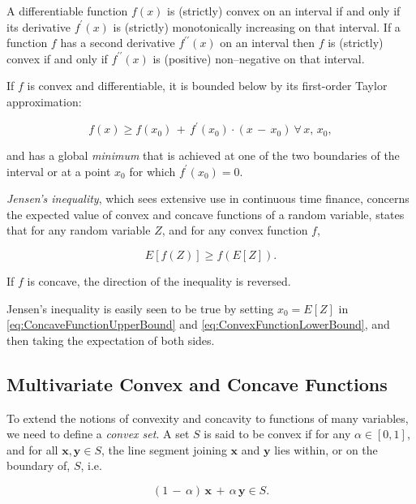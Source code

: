 \documentclass[graybox,envcountchap,sectrefs]{svmono}\usepackage[]{graphicx}\usepackage[]{xcolor}
\begin{document}
\begin{appendices}
A differentiable function $f(x)$ is (strictly) convex on an interval
if and only if its derivative $f^{\prime}(x)$ is (strictly) monotonically
increasing on that interval. If a function $f$ has a second derivative
$f^{\prime\prime}(x)$ on an interval then $f$ is (strictly) convex
if and only if $f^{\prime\prime}(x)$ is (positive) non--negative
on that interval.

If $f$ is convex and differentiable, it is bounded below by its first-order
Taylor approximation:

\begin{equation}
f(x)\geqslant f(x_{0})\,+\,f^{\prime}(x_{0})\cdot(x\,-\,x_{0})\ \forall\,x,\,x_{0},\label{eq:ConvexFunctionLowerBound}
\end{equation}

and has a global \emph{minimum} that is achieved at one of the two
boundaries of the interval or at a point $x_{0}$ for which $f^{\prime}(x_{0})=0.$ 

\emph{Jensen's inequality}, which sees extensive use in continuous
time finance, concerns the expected value of convex and concave functions
of a random variable, states that for any random variable $Z$, and
for any convex function $f$,

\begin{equation}
E\left[f\left(Z\right)\right]\geqslant f\left(E\left[Z\right]\right).\label{eq:JensensInequalityConvexFunction}
\end{equation}

If $f$ is concave, the direction of the inequality is reversed. 

Jensen's inequality is easily seen to be true by setting $x_{0}=E\left[Z\right]$
in \eqref{eq:ConcaveFunctionUpperBound} and \eqref{eq:ConvexFunctionLowerBound},
and then taking the expectation of both sides.

\subsection{Multivariate Convex and Concave Functions}

To extend the notions of convexity and concavity to functions of many
variables, we need to define a \emph{convex set}. A set $S$ is said
to be convex if for any $\alpha\in[0,1]$, and for all $\mathrm{\mathbf{x}},\mathrm{\mathbf{y}}\in S$,
the line segment joining $\mathrm{\mathbf{x}}$ and $\mathrm{\mathbf{y}}$
lies within, or on the boundary of, $S$, i.e.

\begin{equation}
(1\,-\,\alpha)\,\mathbf{x}\,+\,\alpha\,\mathrm{\mathbf{y}}\in S.\label{Convex set}
\end{equation}


\end{appendices}
\end{document}
